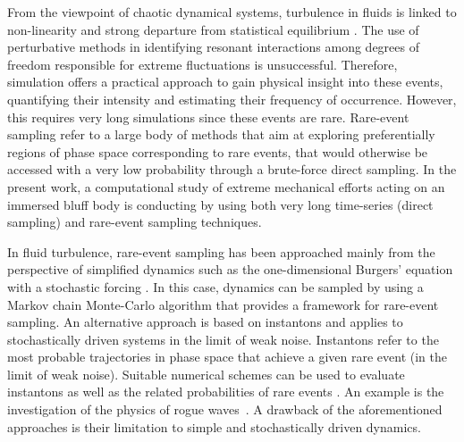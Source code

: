 \documentclass{jfm}
\begin{document}
From the viewpoint of chaotic dynamical systems, turbulence in fluids is linked to non-linearity and strong departure from statistical equilibrium \citep{KRAICHNAN}.
The use of perturbative methods in identifying resonant interactions among degrees of freedom responsible for extreme fluctuations is unsuccessful.
Therefore, simulation offers a practical approach to gain physical insight into these events, quantifying their intensity and estimating their frequency of occurrence.
However, this requires very long simulations since these events are rare.
%
{Rare-event sampling refer to a large body of methods that aim at exploring preferentially regions of phase space corresponding to rare events, that would otherwise be accessed with a very low probability through a brute-force direct sampling.}
%
In the present work, a computational study of extreme mechanical efforts acting on an immersed bluff body is conducting by using both very long time-series (direct sampling) and rare-event sampling techniques.
%	
	
%
In fluid turbulence, rare-event sampling has been approached mainly from the perspective of simplified dynamics such as the one-dimensional Burgers' equation with a stochastic forcing \citep{bec_burgers_2007}. In this case, dynamics can be sampled by using a Markov chain Monte-Carlo algorithm \citep{duben_monte_2008,mesterhazy2011anomalous,mesterhazy2013lattice} that provides a framework for rare-event sampling.
%
An alternative approach is based on instantons \citep{gurarie_instantons_1996,grafke2015instanton} and applies to stochastically driven systems in the limit of weak noise.
Instantons refer to the most probable trajectories in phase space that achieve a given rare event (in the limit of weak noise). Suitable numerical schemes can be used to evaluate instantons as well as the related probabilities of rare events \citep{chernykh_large_2001,grafke_instanton_2013,grigorio_instantons_2017,laurie2015computation,bouchet2014langevin}.
An example is the investigation of the physics of rogue waves~\citep{dematteis2018rogue,dematteis2019experimental}.
%
A drawback of the aforementioned approaches is their limitation to simple and stochastically driven dynamics.
%
\end{document}
